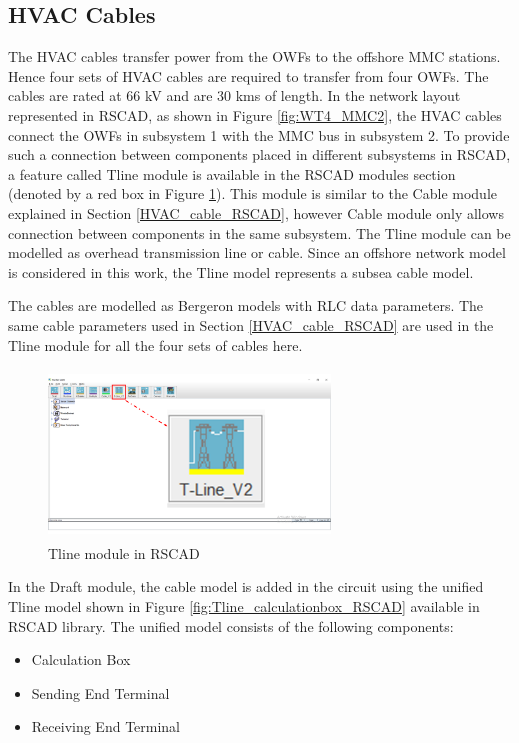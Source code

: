 \subsection{HVAC Cables}\label{Tline_cable_RSCAD}
The \gls{HVAC} cables transfer power from the \gls{OWF}s to the offshore \gls{MMC} stations. Hence four sets of \gls{HVAC} cables are required to transfer from four \gls{OWF}s. The cables are rated at 66 kV and are 30 kms of length. In the network layout represented in RSCAD, as shown in Figure \ref{fig:WT4_MMC2}, the \gls{HVAC} cables connect the \gls{OWF}s in subsystem 1 with the \gls{MMC} bus in subsystem 2. To provide such a connection between components placed in different subsystems in RSCAD, a feature called Tline module is available in the RSCAD modules section (denoted by a red box in Figure \ref{fig:TlineModule_mark}). This module is similar to the Cable module explained in Section \ref{HVAC_cable_RSCAD}, however Cable module only allows connection between components in the same subsystem. The Tline module can be modelled as overhead transmission line or cable. Since an offshore network model is considered in this work, the Tline model represents a subsea cable model. 

The cables are modelled as Bergeron models with RLC data parameters. The same cable parameters used in Section \ref{HVAC_cable_RSCAD} are used in the Tline module for all the four sets of cables here. 
 
 \begin{figure}[H]
\centering
    \includegraphics[height = 4.5cm,width = 7.5cm]{Diagrams/Chapter_4/Tline_module_Final.png}
    \caption{Tline module in RSCAD}
    \label{fig:TlineModule_mark}
\end{figure}
 
 In the Draft module, the cable model is added in the circuit using the unified Tline model shown in Figure \ref{fig:Tline_calculationbox_RSCAD} available in RSCAD library. The unified model consists of the following components: 
    \begin{itemize}[noitemsep]
    \item Calculation Box
    \item Sending End Terminal
    \item Receiving End Terminal
\end{itemize}

